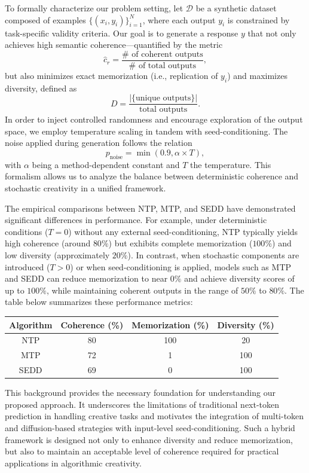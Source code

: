 \documentclass[11pt]{article}
\begin{document}
To formally characterize our problem setting, let \(\mathcal{D}\) be a synthetic dataset composed of examples \( \{(x_i, y_i)\}_{i=1}^N \), where each output \(y_i\) is constrained by task-specific validity criteria. Our goal is to generate a response \(y\) that not only achieves high semantic coherence—quantified by the metric 
\[
\hat{c}_r = \frac{\# \text{ of coherent outputs}}{\# \text{ of total outputs}},
\]
but also minimizes exact memorization (i.e., replication of \(y_i\)) and maximizes diversity, defined as 
\[
D = \frac{|\{ \text{unique outputs} \}|}{\text{total outputs}}.
\]
In order to inject controlled randomness and encourage exploration of the output space, we employ temperature scaling in tandem with seed-conditioning. The noise applied during generation follows the relation 
\[
p_{\text{noise}} = \min(0.9, \alpha \times T),
\]
with \(\alpha\) being a method-dependent constant and \(T\) the temperature. This formalism allows us to analyze the balance between deterministic coherence and stochastic creativity in a unified framework.

The empirical comparisons between NTP, MTP, and SEDD have demonstrated significant differences in performance. For example, under deterministic conditions (\(T=0\)) without any external seed-conditioning, NTP typically yields high coherence (around \(80\%\)) but exhibits complete memorization (\(100\%\)) and low diversity (approximately \(20\%\)). In contrast, when stochastic components are introduced (\(T>0\)) or when seed-conditioning is applied, models such as MTP and SEDD can reduce memorization to near \(0\%\) and achieve diversity scores of up to \(100\%\), while maintaining coherent outputs in the range of \(50\%\) to \(80\%\). The table below summarizes these performance metrics:

\begin{center}
\begin{tabular}{|c|c|c|c|}
\hline
Algorithm & Coherence (\%) & Memorization (\%) & Diversity (\%) \\
\hline
NTP  & 80   & 100   & 20 \\
MTP  & 72   & 1     & 100 \\
SEDD & 69   & 0     & 100 \\
\hline
\end{tabular}
\end{center}

This background provides the necessary foundation for understanding our proposed approach. It underscores the limitations of traditional next-token prediction in handling creative tasks and motivates the integration of multi-token and diffusion-based strategies with input-level seed-conditioning. Such a hybrid framework is designed not only to enhance diversity and reduce memorization, but also to maintain an acceptable level of coherence required for practical applications in algorithmic creativity.
\end{document}
